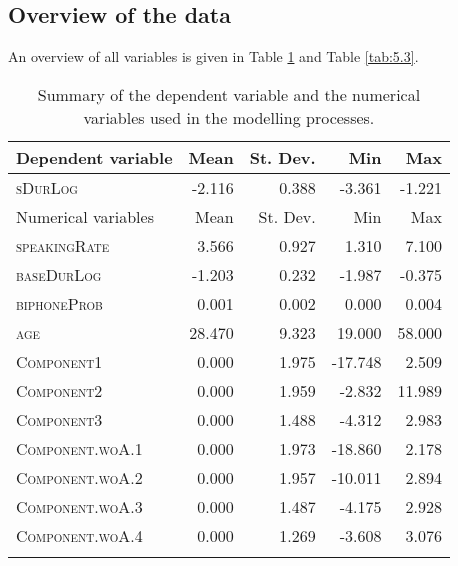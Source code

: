 \subsection{Overview of the data}\label{section05_2_2}

An overview of all variables is given in Table \ref{tab:5.2} and Table \ref{tab:5.3}.

\begin{table}\fontsize{10}{11}
\caption{Summary of the dependent variable and the numerical variables used in the modelling processes.}
\label{tab:5.2}
\centering
\begin{tabular}{lrrrr} 
\lsptoprule
Dependent variable  & Mean   & St. Dev. & Min     & Max     \\ 
\midrule
\textsc{sDurLog}             & -2.116 & 0.388    & -3.361  & -1.221  \\ 
\midrule
Numerical variables & Mean   & St. Dev. & Min     & Max     \\ 
\midrule
\textsc{speakingRate}        & 3.566  & 0.927    & 1.310   & 7.100   \\
\textsc{baseDurLog}          & -1.203 & 0.232    & -1.987  & -0.375  \\
\textsc{biphoneProb}         & 0.001  & 0.002    & 0.000   & 0.004   \\
\textsc{age}                 & 28.470 & 9.323    & 19.000  & 58.000  \\
\textsc{Component1}          & 0.000  & 1.975    & -17.748 & 2.509   \\
\textsc{Component2}          & 0.000  & 1.959    & -2.832  & 11.989  \\
\textsc{Component3}          & 0.000  & 1.488    & -4.312  & 2.983   \\
\textsc{Component.woA.1}     & 0.000  & 1.973    & -18.860 & 2.178   \\
\textsc{Component.woA.2}     & 0.000  & 1.957    & -10.011 & 2.894   \\
\textsc{Component.woA.3}     & 0.000  & 1.487    & -4.175  & 2.928   \\
\textsc{Component.woA.4}     & 0.000  & 1.269    & -3.608  & 3.076   \\
\lspbottomrule
\end{tabular}
\end{table}



